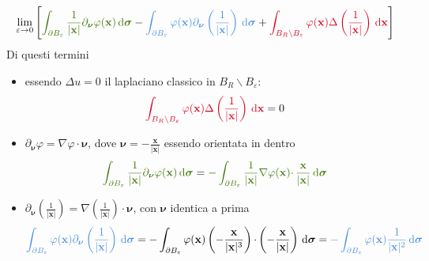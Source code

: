 \documentclass[10pt,a4paper,twoside,openright]{book}
\newcommand{\x}{\mathbf{x}}
\newcommand{\sigg}{\bm{\sigma}}
\newcommand{\nuu}{\bm{\nu}}
\newcommand{\de}{\,\mathrm d}
\newcommand{\dxx}{\de \x}
\newcommand{\dsig}{\de \sigg}
\begin{document}
\begin{equation}
    \lim _{\varepsilon \rightarrow 0}\left[\textcolor[rgb]{0.25,0.46,0.02}{\int _{\partial B_{\varepsilon }}\frac{1}{| \x| } \partial _{\nuu} \varphi (\x) \dsig } -\textcolor[rgb]{0.29,0.56,0.89}{\int _{\partial B_{\varepsilon }} \varphi (\x) \partial _{\nuu}\left(\frac{1}{| \x| }\right) \dsig } +\textcolor[rgb]{0.82,0.01,0.11}{\int _{B_{R} \backslash B_{\varepsilon }} \varphi (\x) \Delta \left(\frac{1}{| \x| }\right) \dxx}\right]
    \label{eq:esempio-derivata-limite-2}
\end{equation}
Di questi termini
\begin{itemize}
    \item essendo $\displaystyle \Delta u=0$ il laplaciano classico in $\displaystyle B_{R} \backslash B_{\varepsilon }$:
          \begin{equation*}
              \textcolor[rgb]{0.82,0.01,0.11}{\int _{B_{R} \backslash B_{\varepsilon }} \varphi (\x) \Delta \left(\frac{1}{| \x| }\right) \dxx} =0
          \end{equation*}
    \item  $\displaystyle \partial _{\nuu} \varphi =\nabla \varphi \cdotp \nuu$, dove $\displaystyle \nuu =-\frac{\x}{| \x| }$ essendo orientata in dentro
          \begin{equation*}
              \textcolor[rgb]{0.25,0.46,0.02}{\int _{\partial B_{\varepsilon }}\frac{1}{| \x| } \partial _{\nuu} \varphi (\x) \dsig } =\textcolor[rgb]{0.25,0.46,0.02}{-\int _{\partial B_{\varepsilon }}\frac{1}{| \x| } \nabla \varphi (\x) \cdotp \frac{\x}{| \x| } \dsig }
          \end{equation*}
    \item $\displaystyle \partial _{\nuu}\left(\frac{1}{| \x| }\right) =\nabla \left(\frac{1}{| \x| }\right) \cdotp \nuu$, con $\displaystyle \nuu$ identica a prima
          \begin{equation*}
              \textcolor[rgb]{0.29,0.56,0.89}{\int _{\partial B_{\varepsilon }} \varphi (\x) \partial_{\nuu}\left(\frac{1}{| \x| }\right) \dsig } =-\int _{\partial B_{\varepsilon }} \varphi (\x)\left(-\frac{\x}{| \x| ^{3}}\right) \cdotp \left(-\frac{\x}{| \x| }\right) \dsig =\textcolor[rgb]{0.29,0.56,0.89}{-\int _{\partial B_{\varepsilon }} \varphi (\x)\frac{1}{| \x| ^{2}} \dsig }
          \end{equation*}
\end{itemize}
\end{document}
